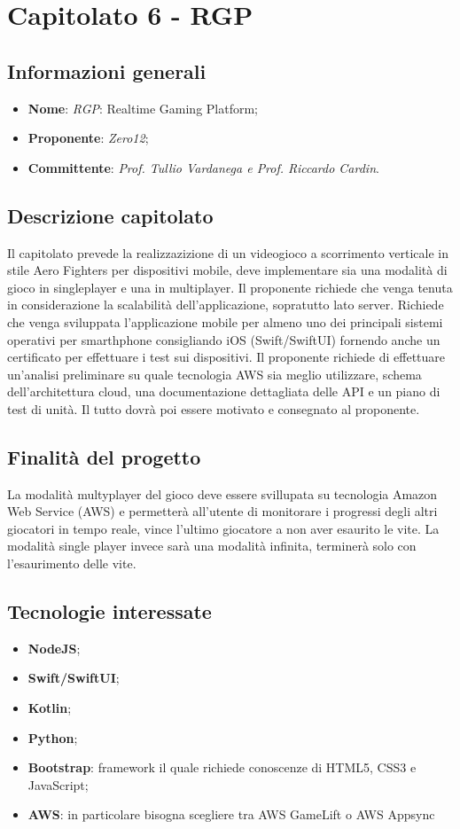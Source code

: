 \section{Capitolato 6 - RGP}
\subsection{Informazioni generali}
\begin{itemize}
    \item \textbf{Nome}: \emph{RGP}: Realtime Gaming Platform;
    \item \textbf{Proponente}: \emph{Zero12};
    \item \textbf{Committente}: \emph{Prof. Tullio Vardanega e Prof. Riccardo Cardin}.
\end{itemize}
\subsection{Descrizione capitolato}
Il capitolato prevede la realizzazizione di un videogioco a scorrimento verticale in stile Aero Fighters per dispositivi mobile, deve implementare sia una modalità di gioco in singleplayer e una in multiplayer.
Il proponente richiede che venga tenuta in considerazione la scalabilità dell'applicazione, sopratutto lato server.
Richiede che venga sviluppata l'applicazione mobile per almeno uno dei principali sistemi operativi per smarthphone consigliando iOS (Swift/SwiftUI) fornendo anche un certificato per effettuare i test sui dispositivi.
Il proponente richiede di effettuare un'analisi preliminare su quale tecnologia AWS sia meglio utilizzare, schema dell'architettura cloud, una documentazione dettagliata delle API e un piano di test di unità. Il tutto dovrà poi essere motivato e consegnato al proponente.
\subsection{Finalità del progetto}
La modalità multyplayer del gioco deve essere svillupata su tecnologia Amazon Web Service (AWS) e permetterà all'utente di monitorare i progressi degli altri giocatori in tempo reale, vince l'ultimo giocatore a non aver esaurito le vite. 
La modalità single player invece sarà una modalità infinita, terminerà solo con l'esaurimento delle vite.
\subsection{Tecnologie interessate}
\begin{itemize}
    \item \textbf{NodeJS};
	\item \textbf{Swift/SwiftUI};
	\item \textbf{Kotlin};
	\item \textbf{Python};
	\item \textbf{Bootstrap}: framework il quale richiede conoscenze di HTML5, CSS3 e JavaScript;
	\item \textbf{AWS}: in particolare bisogna scegliere tra AWS GameLift o AWS Appsync
\end{itemize}
